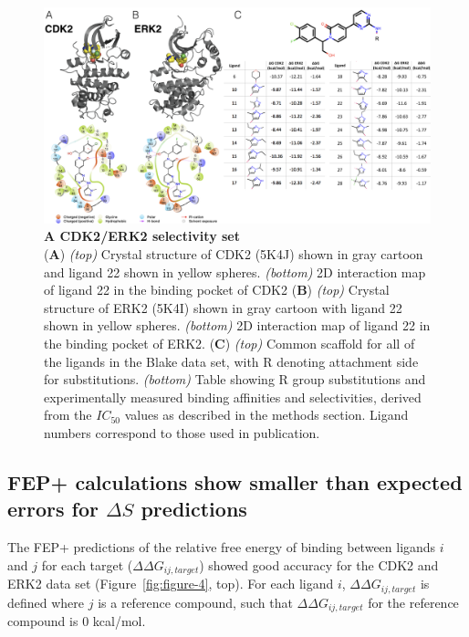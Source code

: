 \documentclass[phd,tocprelim]{cornell}
\begin{document}
\begin{landscape}
\begin{figure}[p]
\centering
\includegraphics[width=1.0\linewidth]{figures/figure3.png}
\caption[A CDK2/ERK2 selectivity set]{
{\bf A CDK2/ERK2 selectivity set}\\
({\bf A})  \emph{(top)} Crystal structure of CDK2 (5K4J) shown in gray cartoon and ligand 22 shown in yellow spheres. \emph{(bottom)} 2D interaction map of ligand 22 in the binding pocket of CDK2
({\bf B}) \emph{(top)} Crystal structure of ERK2 (5K4I) shown in gray cartoon with ligand 22 shown in yellow spheres. \emph{(bottom)} 2D interaction map of ligand 22 in the binding pocket of ERK2.
({\bf C}) \emph{(top)} Common scaffold for all of the ligands in the Blake data set, with R denoting attachment side for substitutions. \emph{(bottom)} Table showing R group substitutions and experimentally measured binding affinities and selectivities, derived from the $IC_{50}$ values as described in the methods section. Ligand numbers correspond to those used in publication. 
}
\label{fig:figure-3}
\end{figure}
\end{landscape}

\subsection{FEP+ calculations show smaller than expected errors for $\Delta S$ predictions}
The FEP+ predictions of the relative free energy of binding between ligands $i$ and $j$ for each target ($\Delta \Delta G_{ij, target}$) showed good accuracy for the CDK2 and ERK2 data set (Figure~\ref{fig:figure-4}, top). For each ligand $i$, $\Delta \Delta G_{ij, target}$ is defined where $j$ is a reference compound, such that $\Delta \Delta G_{ij, target}$ for the reference compound is 0 kcal/mol. 
\end{document}
